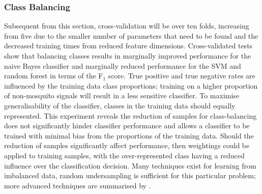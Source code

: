    

        \subsubsection{Class Balancing}
        \label{subsubsec:exp-clf-opt-class}
            Subsequent from this section, cross-validation will be over ten folds, increasing from five due to the smaller number of parameters that need to be found and the decreased training times from reduced feature dimensions. Cross-validated tests show that balancing classes results in marginally improved performance for the naive Bayes classifier and marginally reduced performance for the SVM and random forest in terms of the F$_{1}$ score. True positive and true negative rates are influenced by the training data class proportions; training on a higher proportion of non-mosquito signals will result in a less sensitive classifier. To maximise generalisability of the classifier, classes in the training data should equally represented. This experiment reveals the reduction of samples for class-balancing does not significantly hinder classifier performance and allows a classifier to be trained with minimal bias from the proportions of the training data. Should the reduction of samples significantly affect performance, then weightings could be applied to training samples, with the over-represented class having a reduced influence over the classification decision. Many techniques exist for learning from imbalanced data, random undersampling is sufficient for this particular problem; more advanced techniques are summarised by \textcite{He2009}.
                    
